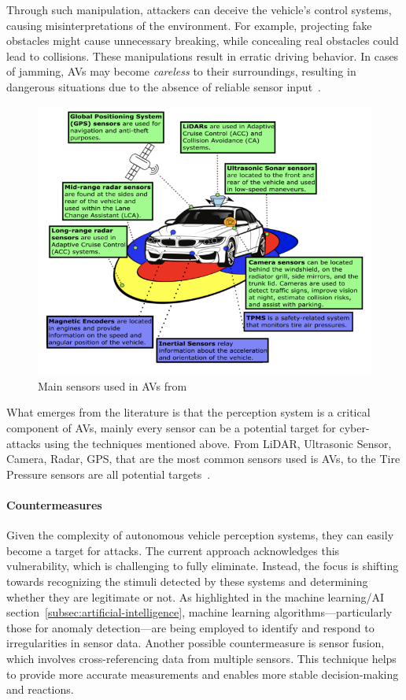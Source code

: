 Through such manipulation, attackers can deceive the vehicle's control systems, causing misinterpretations of the environment.
For example, projecting fake obstacles might cause unnecessary breaking, while concealing real obstacles could lead to collisions.
These manipulations result in erratic driving behavior.
In cases of jamming, AVs may become \textit{careless} to their surroundings, resulting in dangerous situations due to the absence of reliable sensor input~\cite{durlik2022cybersecurity}.

\begin{figure}[!htb]
    \centering
    \includegraphics[width=0.7\linewidth]{figures/sensors}
    \caption{Main sensors used in AVs from~\cite{sensors}}
    \label{fig:sensors-2}
\end{figure}

What emerges from the literature is that the perception system is a critical component of AVs, mainly every sensor can be a potential target for cyber-attacks using the techniques mentioned above.
From LiDAR, Ultrasonic Sensor, Camera, Radar, GPS, that are the most common sensors used is AVs, to the Tire Pressure sensors are all potential targets~\cite{sensors}.


\paragraph{Countermeasures}

Given the complexity of autonomous vehicle perception systems, they can easily become a target for attacks.
The current approach acknowledges this vulnerability, which is challenging to fully eliminate.
Instead, the focus is shifting towards recognizing the stimuli detected by these systems and determining whether they are legitimate or not.
As highlighted in the machine learning/AI section~\ref{subsec:artificial-intelligence}, machine learning algorithms—particularly those for anomaly detection—are being employed to identify and respond to irregularities in sensor data.
Another possible countermeasure is sensor fusion, which involves cross-referencing data from multiple sensors.
This technique helps to provide more accurate measurements and enables more stable decision-making and reactions.

